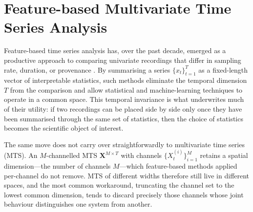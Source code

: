 \documentclass{article}
\theoremstyle{plain}
\theoremstyle{definition}
\theoremstyle{remark}
\begin{document}

\printAffiliationsAndNotice{\icmlEqualContribution}

\section{Feature-based Multivariate Time Series Analysis}
\label{sec:fbmts}

Feature-based time series analysis has, over the past decade, emerged as a productive approach to comparing univariate recordings that differ in sampling rate, duration, or provenance \cite{}. By summarising a series $\{x_t\}_{t=1}^{T}$ as a fixed-length vector of interpretable statistics, such methods eliminate the temporal dimension $T$ from the comparison and allow statistical and machine-learning techniques to operate in a common space. This temporal invariance is what underwrites much of their utility: if two recordings can be placed side by side only once they have been summarised through the same set of statistics, then the choice of statistics becomes the scientific object of interest.

The same move does not carry over straightforwardly to multivariate time series (MTS). An $M$-channelled MTS $\mathbf{X}^{M \times T}$ with channels $\{X_t^{(i)}\}_{i=1}^{M}$ retains a spatial dimension---the number of channels $M$---which feature-based methods applied per-channel do not remove. MTS of different widths therefore still live in different spaces, and the most common workaround, truncating the channel set to the lowest common dimension, tends to discard precisely those channels whose joint behaviour distinguishes one system from another.
\end{document}

